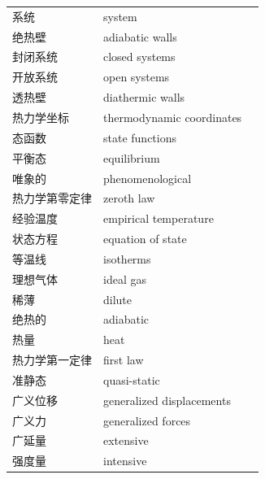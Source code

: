 \begin{xltabular}{\textwidth}{@{}l l c@{}}
  系统 & {\glossaryfont system} & \pageref{term:1.system} \\
  绝热壁 & {\glossaryfont adiabatic walls} & \pageref{term:1.adiabatic-wall} \\
  封闭系统 & {\glossaryfont closed systems} & \pageref{term:1.closed} \\
  开放系统 & {\glossaryfont open systems} & \pageref{term:1.open} \\
  透热壁 & {\glossaryfont diathermic walls} & \pageref{term:1.diathermic} \\
  热力学坐标 & {\glossaryfont thermodynamic coordinates} & \pageref{term:1.thermo-coord} \\
  态函数 & {\glossaryfont state functions} & \pageref{term:1.state-fn} \\
  平衡态 & {\glossaryfont equilibrium} & \pageref{term:1.equilibrium} \\
  唯象的 & {\glossaryfont phenomenological} & \pageref{term:1.phenomenological} \\
  热力学第零定律 & {\glossaryfont zeroth law} & \pageref{term:1.zeroth-law} \\
  经验温度 & {\glossaryfont empirical temperature} & \pageref{term:1.emp-temp} \\
  状态方程 & {\glossaryfont equation of state} & \pageref{term:1.eos} \\
  等温线 & {\glossaryfont isotherms} & \pageref{term:1.isotherm} \\
  理想气体 & {\glossaryfont ideal gas} & \pageref{term:1.ideal-gas} \\
  稀薄 & {\glossaryfont dilute} & \pageref{term:1.dilute} \\
  绝热的 & {\glossaryfont adiabatic} & \pageref{term:1.adiabatic} \\
  热量 & {\glossaryfont heat} & \pageref{term:1.heat} \\
  热力学第一定律 & {\glossaryfont first law} & \pageref{term:1.first-law} \\
  准静态 & {\glossaryfont quasi-static} & \pageref{term:1.quasistatic} \\
  广义位移 & {\glossaryfont generalized displacements} & \pageref{term:1.gen-disp} \\
  广义力 & {\glossaryfont generalized forces} & \pageref{term:1.gen-force} \\
  广延量 & {\glossaryfont extensive} & \pageref{term:1.extensive} \\
  强度量 & {\glossaryfont intensive} & \pageref{term:1.intensive} \\

\end{xltabular}
